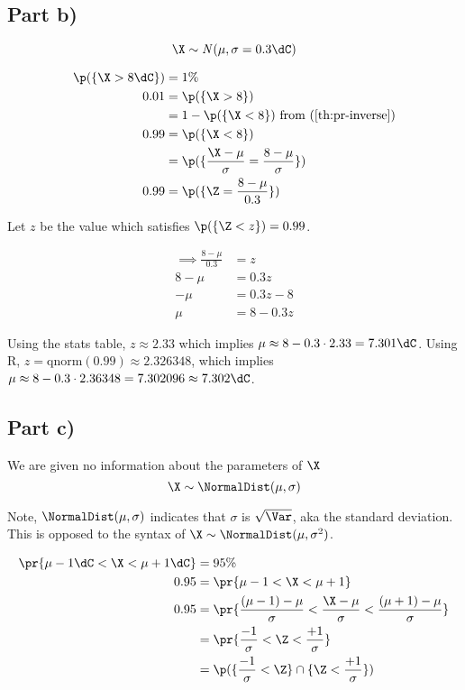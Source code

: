\subsection*{Part b)}

\[
\X \sim \mathit{N}(\mu, \sigma = 0.3 \dC)
\]

\begin{align*}
\p(\{ \X > 8\dC \}) &= 1\% \\
0.01 &= \p(\{ \X > 8 \}) \\
&= 1 - \p(\{ \X < 8 \})
\text{	from (\ref{th:pr-inverse})} \\
0.99 &= \p(\{ \X < 8 \}) \\
&= \p(\{ \frac{\X - \mu}{\sigma} = \frac{8 - \mu}{\sigma}\}) \\
0.99 &= \p(\{ \Z = \frac{8 - \mu}{0.3}\}) \\
\end{align*}

Let $z$ be the value which satisfies $\p(\{ \Z < z \}) = 0.99$.

\begin{align*}
\implies \frac{8 - \mu}{0.3} &= z \\
8 - \mu &= 0.3z \\
-\mu &= 0.3z - 8 \\
\mu &= 8 - 0.3z
\end{align*}

Using the stats table, $z \approx 2.33$ which implies $\mu \approx 8 - 0.3 \cdot 2.33 = 7.301\dC$.
Using R, $z = \text{qnorm}(0.99) \approx 2.326348$, which implies $\mu \approx 8 - 0.3 \cdot 2.36348 = 7.302096 \approx 7.302\dC$.

\subsection*{Part c)}

We are given no information about the parameters of $\X$
\[
\X \sim \NormalDist (\mu, \sigma)
\]

Note, $\NormalDist(\mu, \sigma)$ indicates that $\sigma$ is $\sqrt{\Var}$, aka the standard deviation. This is opposed to the syntax of $\X \sim \NormalDist(\mu, \sigma^2)$.

\begin{align*}
\pr{\mu - 1\dC < \X < \mu + 1\dC} &= 95\% \\
0.95 &= \pr{\mu - 1 < \X < \mu + 1} \\
0.95 &= \pr{\frac{(\mu - 1) - \mu}{\sigma} < \frac{\X - \mu}{\sigma} < \frac{(\mu + 1) - \mu}{\sigma}} \\
&= \pr{\frac{-1}{\sigma} < \Z < \frac{+1}{\sigma}} \\
&= \p(\{ \frac{-1}{\sigma} < \Z \} \cap \{\Z < \frac{+1}{\sigma} \}) \\
\end{align*}

